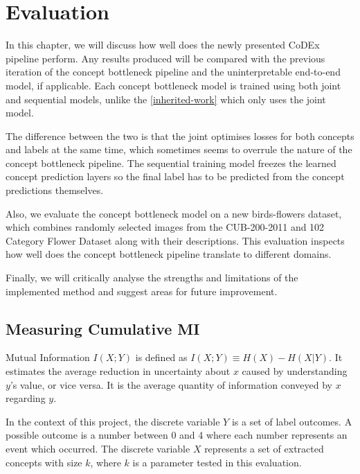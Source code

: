 \section{Evaluation}

In this chapter, we will discuss how well does the newly presented CoDEx pipeline perform.
Any results produced will be compared with the previous iteration of the concept bottleneck pipeline and the uninterpretable end-to-end model, if applicable.
Each concept bottleneck model is trained using both joint and sequential models, unlike the \ref{inherited-work} which only uses the joint model.

The difference between the two is that the joint optimises losses for both concepts and labels at the same time, which sometimes seems to overrule the nature of the concept bottleneck pipeline.
The sequential training model freezes the learned concept prediction layers so the final label has to be predicted from the concept predictions themselves.

Also, we evaluate the concept bottleneck model on a new birds-flowers dataset, which combines randomly selected images from the CUB-200-2011 and 102 Category Flower Dataset along with their descriptions.
This evaluation inspects how well does the concept bottleneck pipeline translate to different domains.

Finally, we will critically analyse the strengths and limitations of the implemented method and suggest areas for future improvement.


\subsection{Measuring Cumulative MI}

Mutual Information $I(X;Y)$ \cite{RefWorks:RefID:30-mackay2004information} is defined as $I(X; Y) \equiv H(X) - H(X|Y)$. 
It estimates the average reduction in uncertainty about $x$ caused by understanding $y$'s value, or vice versa. 
It is the average quantity of information conveyed by $x$ regarding $y$.

In the context of this project, the discrete variable $Y$ is a set of label outcomes. A possible outcome is a number between 0 and 4 where each number represents an event which occurred.
The discrete variable $X$ represents a set of extracted concepts with size $k$, where $k$ is a parameter tested in this evaluation.

